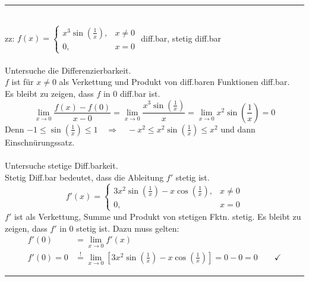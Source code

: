 \documentclass{article}
\newcommand{\lr}[1]{\left(#1\right)}
\newcommand{\lreck}[1]{\left[#1\right]}
\begin{document}
{\color{blue}
\hrule
	\\
	zz: $f(x) = \begin{cases}x^3\sin\lr{\frac{1}{x}}, & x\neq 0\\ 0, & x= 0\end{cases}$ \quad diff.bar, stetig diff.bar\\
	\\
	Untersuche die Differenzierbarkeit.\\
	$f$ ist für $x\neq 0$ als Verkettung und Produkt von diff.baren Funktionen diff.bar.\\
	Es bleibt zu zeigen, dass $f$ in $0$ diff.bar ist.
		$$\lim\limits_{x\rightarrow 0} \frac{f(x) - f(0)}{x - 0} = \lim\limits_{x\rightarrow 0} \frac{x^3\sin\lr{\frac{1}{x}}}{x} = \lim\limits_{x\rightarrow 0} x^2\sin\lr{\frac{1}{x}} = 0$$
	{\color{gruen} Denn $-1\leq \sin\lr{\frac{1}{x}} \leq 1 \quad\Rightarrow\quad -x^2\leq x^2\sin\lr{\frac{1}{x}} \leq x^2$ und dann Einschnürungssatz.}\\
	\\
	Untersuche stetige Diff.barkeit.\\
	Stetig Diff.bar bedeutet, dass die Ableitung $f'$ stetig ist.
		$$f'(x) = \begin{cases}3x^2\sin\lr{\frac{1}{x}} - x\cos\lr{\frac{1}{x}}, & x\neq 0\\0, & x = 0\end{cases}$$
	$f'$ ist als Verkettung, Summe und Produkt von stetigen Fktn. stetig. Es bleibt zu zeigen, dass $f'$ in $0$ stetig ist. Dazu muss gelten:
		\begin{align*}
			f'(0) &= \lim\limits_{x\rightarrow 0}  f'(x)\\
			f'(0) = 0 &\stackrel{!}{=} \lim\limits_{x\rightarrow 0} \lreck{3x^2\sin\lr{\frac{1}{x}} - x\cos\lr{\frac{1}{x}}} = 0 - 0 = 0 \qquad \checkmark
		\end{align*}			
	
\hrule
} 


\newpage
\end{document}
